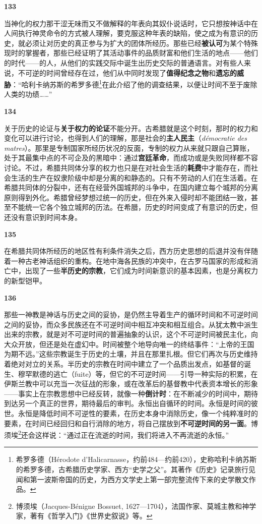 \documentclass[fontset=fandol, a4paper, 12pt, openright]{ctexbook}
\makeatletter
\newcommand{\thesis}[1]{%
    \par\vspace{1.5em}%
    {\centering \textbf{\Large #1}\par}%
    \nobreak\vspace{0.5em}\nobreak
    \@afterindenttrue %
    \@afterheading    %
}
\makeatother
\begin{document}
\thesis{133}
当神化的权力那干涩无味而又不做解释的年表向其奴仆说话时，它只想按神话中在人间执行神灵命令的方式被人理解，要克服这种年表的缺陷，使之成为有意识的历史，就必须让对历史的真正参与为扩大的团体所经历。那些已经\textbf{被认可}为某个特殊现时的掌握者，那些已经证明了其活动事件的品质财富和他们生活的地点——他们的时代——的人，从他们的实践交际中诞生出历史交际的普通语言。对有些人来说，不可逆的时间曾经存在过，他们从中同时发现了\textbf{值得纪念之物}和\textbf{遗忘的威胁}：“哈利卡纳苏斯的希罗多德\footnote{希罗多德（Hérodote d'Halicarnasse，约前484—约前420），史称哈利卡纳苏斯的希罗多德，古希腊历史学家、西方“史学之父”。其著作《历史》记录旅行见闻和第一波斯帝国的历史，为西方文学史上第一部完整流传下来的史学散文作品。}在此介绍了他的调查结果，以便让时间不至于废除人类的功绩……”

\thesis{134}
关于历史的论证与\textbf{关于权力的论证}不能分开。古希腊就是这个时刻，那时的权力和变化可以进行讨论，也得到人们的理解，那是社会的\textbf{主人民主}（\textit{démocratie des matres}）。那里是专制国家所经历状况的反面，专制的权力从来就只跟自己算账，处于其最集中点的不可企及的黑暗中：通过\textbf{宫廷革命}，而成功或是失败同样都不容讨论。不过，希腊共同体分享的权力也只是在对社会生活的\textbf{耗费}中才能存在，而社会生活的生产在奴隶阶级中却是分离的和静态的。只有不劳动的人们在生活着。在希腊共同体的分裂中，还有在经营外国城邦的斗争中，在国内建立每个城邦的分离原则得到外化。希腊曾经梦想过统一的历史，但在外来入侵时却不能团结一致，甚至不能统一它各个独立城邦的历法。在希腊，历史的时间变成了有意识的历史，但还没有意识到时间本身。

\thesis{135}
在希腊共同体所经历的地区性有利条件消失之后，西方历史思想的后退并没有伴随着一种古老神话组织的重构。在地中海各民族的冲突中，在古罗马国家的形成和消亡中，出现了一些\textbf{半历史的宗教}，它们成为时间新意识的基本因素，也是分离权力的新型铠甲。

\thesis{136}
那些一神教是神话与历史之间的妥协，是仍然主导着生产的循环时间和不可逆时间之间的妥协，而众多民族还在不可逆时间中相互冲突和相互组合。从犹太教中派生出来的宗教，就是对不可逆时间的普遍抽象的认识，这个不可逆时间被民主化，向大众开放，但还是处在虚幻中。时间被整个地导向唯一的终结事件：“上帝的王国为期不远。”这些宗教诞生于历史的土壤，并且在那里扎根。但它们再次与历史维持着绝对对立的关系。半历史的宗教在时间中建立了一个品质出发点，如基督的诞生、穆罕默德的逃亡（fuite）等，但它的不可逆时间——引导一种实际的积累，在伊斯兰教中可以充当一次征战的形象，或在改革后的基督教中代表资本增长的形象——事实上在宗教思想中已经反转，就像一种\textbf{倒计时}：在不断减少的时间中，期待到达另一个真正的世界，期待最后的审判。永恒出自循环的时间。永恒是时间的彼世。永恒是降低时间不可逆性的要素，在历史本身中消除历史，像一个纯粹准时的要素，在时间已经回归和自行消除的地方，将自己摆放到\textbf{不可逆时间的另一面}。博须埃\footnote{博须埃（Jacques-Bénigne Bossuet, 1627—1704），法国作家、莫城主教和神学家，著有《哲学入门》《世界史叙说》等。}还会这样说：“通过正在流逝的时间，我们将进入不再流逝的永恒。”
\end{document}
